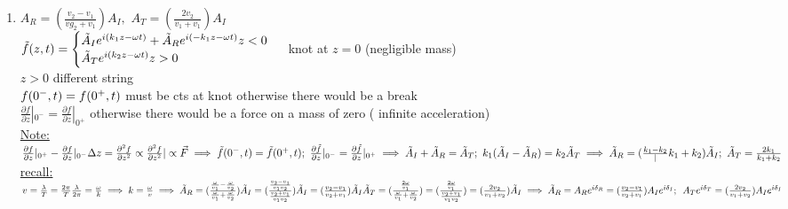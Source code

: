 \documentclass[12pt]{amsart}
\begin{document}
\begin{enumerate}
\item \underline{$A_R= ( \frac{v_2 - v_1}{vg_2 + v_1}) A_I,\,\, A_T = ( \frac{2 v_2}{v_1 + v_1}) A_I$}\\
$\tilde{f}(z,t) = \begin{cases} \tilde{A}_I e^{i(k_1 z- \omega t)} + \tilde{A}_R e^{i(-k_1 z - \omega t)} z<0\\
\tilde{A}_T e^{i(k_2 z - \omega t)} z>0 \end{cases}\\$
knot at $z=0$ (negligible mass)\\
$z>0$ different string\\
$f(0^-, t) = f( 0^+,t)\\$
must be cts at knot otherwise there would be a break\\
$\frac{\partial f}{\partial z} |_{0^-} = \frac{\partial f}{\partial z} |_{0^+}$ otherwise there would be a force on a mass of zero ( infinite acceleration)\\
\underline{Note:} $\frac{\partial f}{\partial z} |_{0^+} - \frac{\partial f}{\partial z}|_{0^-}{\Delta z} = \frac{\partial^2 f}{\partial z^2} \propto \frac{\partial^2 f}{\partial z^2}| \propto \vec{F}\\
\implies \tilde{f}(0^-, t) = \tilde{f}(0^+, t) ;\,\, \frac{\partial 
\tilde{f}}{\partial z} |_{0^-} = \frac{\partial \tilde{f}}{\partial z}|_{0^+}\\
\implies \tilde{A}_I + \tilde{A}_{R} = \tilde{A}_T;\,\, k_1 ( \tilde{A}_I - \tilde{A}_R) = k_2 \tilde{A}_T\\
\implies \tilde{A}_R = ( \frac{k_1 - k_2}|{k_1 + k_2}) \tilde{A}_I;\,\, \tilde{A}_T = \frac{2 k_1}{k_1 + k_2}\\$
\underline{recall:} $v= \frac{\lambda}{T} = \frac{2 \pi}{T} \frac{\lambda}{2 \pi} = \frac{\omega}{k} \implies k= \frac{\omega}{v}\\
\implies \tilde{A}_R = ( \frac{\frac{\omega}{v_1} - \frac{\omega}{v_2}}{\frac{\omega}{v_1} + \frac{\omega}{v_2}}) \tilde{A}_I = ( \frac{\frac{v_2 - v_1}{v_1 v_2}}{\frac{v_2 + v_1}{v_1 v_2}}) \tilde{A}_I = ( \frac{v_2 - v_1}{v_2 + v_1}) \tilde{A}_I\\
\tilde{A}_T = ( \frac{ \frac{2 \omega}{v_1}}{\frac{\omega}{v_1} + \frac{\omega}{v_2}}) = ( \frac{\frac{2 \omega}{v_1}}{\frac{v_2 + v_1}{v_1 v_2}}) = ( \frac{2 v_2}{v_1 + v_2}) \tilde{A}_I\\
\implies \tilde{A}_R = A_R e^{i \delta_R} = ( \frac{v_2 - v_1}{v_2 + v_1}) A_I e^{i \delta_I};\,\,\, A_T e^{i \delta_T} = ( \frac{2 v_2}{v_1 + v_2}) A_I e^{i \delta_I}\\$

\end{enumerate}
\end{document}
